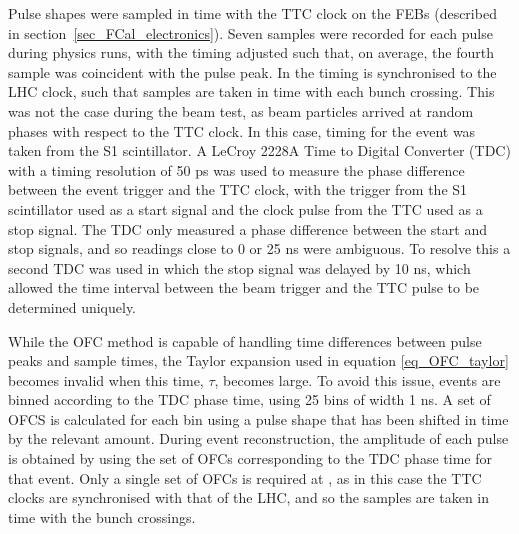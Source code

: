 Pulse shapes were sampled in time with the TTC clock on the FEBs (described in section~\ref{sec_FCal_electronics}). Seven samples were recorded for each pulse during physics runs, with the timing adjusted such that, on average, the fourth sample was coincident with the pulse peak. In \atlas the timing is synchronised to the LHC clock, such that samples are taken in time with each bunch crossing. This was not the case during the beam test, as beam particles arrived at random phases with respect to the TTC clock. In this case, timing for the event was taken from the S1 scintillator. A LeCroy 2228A Time to Digital Converter (TDC)  with a timing resolution of 50 ps was used to measure the phase difference between the event trigger and the TTC clock, with the trigger from the S1 scintillator used as a start signal and the clock pulse from the TTC used as a stop signal. The TDC only measured a phase difference between the start and stop signals, and so readings close to 0 or 25 ns were ambiguous. To resolve this a second TDC was used in which the stop signal was delayed by 10 ns, which allowed the time interval between the beam trigger and the TTC pulse to be determined uniquely. 

While the OFC method is capable of handling time differences between pulse peaks and sample times, the Taylor expansion used in equation \ref{eq_OFC_taylor} becomes invalid when this time, $\tau$, becomes large. To avoid this issue, events are binned according to the TDC phase time, using 25 bins of width 1 ns. A set of OFCS is calculated for each bin using a pulse shape that has been shifted in time by the relevant amount. During event reconstruction, the amplitude of each pulse is obtained by using the set of OFCs corresponding to the TDC phase time for that event. Only a single set of OFCs is required at \atlas, as in this case the TTC clocks are synchronised with that of the LHC, and so the samples are taken in time with the bunch crossings.

